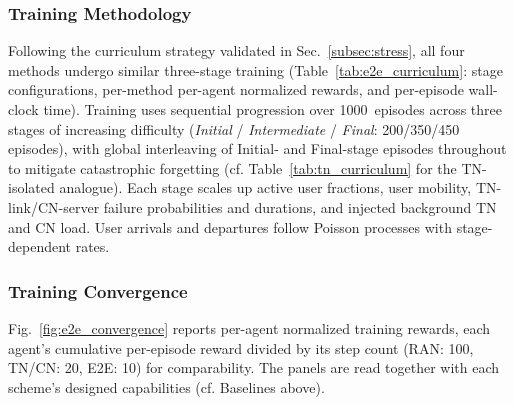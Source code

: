 \documentclass[12pt,lettersize,journal,onecolumn]{IEEEtran}
\begin{document}
\subsubsection{Training Methodology}\label{subsubsec:e2e_curriculum}
Following the curriculum strategy validated in Sec.~\ref{subsec:stress}, all four methods undergo similar three-stage training (Table~\ref{tab:e2e_curriculum}: stage configurations, per-method per-agent normalized rewards, and per-episode wall-clock time). Training uses sequential progression over 1000~episodes across three stages of increasing difficulty (\emph{Initial} / \emph{Intermediate} / \emph{Final}: 200/350/450 episodes), with global interleaving of Initial- and Final-stage episodes throughout to mitigate catastrophic forgetting (cf. Table~\ref{tab:tn_curriculum} for the TN-isolated analogue). 
Each stage scales up active user fractions, user mobility, TN-link/CN-server failure probabilities and durations, and injected background TN and CN load. User arrivals and departures follow Poisson processes with stage-dependent rates.

\subsubsection{Training Convergence}\label{subsubsec:convergence}
Fig.~\ref{fig:e2e_convergence} reports per-agent normalized training rewards, each agent's cumulative per-episode reward divided by its step count (RAN: 100, TN/CN: 20, E2E: 10) for comparability. The panels are read together with each scheme's designed capabilities (cf. Baselines above).
\end{document}
